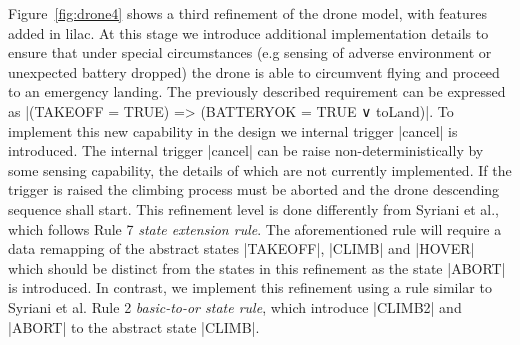 
Figure~\ref{fig:drone4} shows a third refinement of the drone model, with features added in lilac.
At this stage we introduce additional implementation details to ensure that under special 
circumstances (e.g sensing of adverse environment or unexpected battery dropped) the drone is able 
to circumvent flying and proceed to an emergency landing. The previously described requirement can be
expressed as |(TAKEOFF = TRUE) => (BATTERYOK = TRUE ∨ toLand)|.
To implement this new capability in the design we internal trigger |cancel| is introduced.
The internal trigger |cancel| can be raise non-deterministically by some sensing capability, 
the details of which are not currently implemented. If the trigger is raised the climbing process 
must be aborted and the drone descending sequence shall start. This refinement level is done differently 
from Syriani et al., which follows Rule 7 \emph{state extension rule}. 
The aforementioned rule will require a data remapping of the abstract states |TAKEOFF|, |CLIMB| and |HOVER|
which should be distinct from the states in this refinement as the state |ABORT| is introduced.
In contrast, we implement this refinement using a rule similar to Syriani et al. 
Rule 2 \emph{basic-to-or state rule}, which introduce |CLIMB2| and |ABORT| to the abstract state |CLIMB|.




